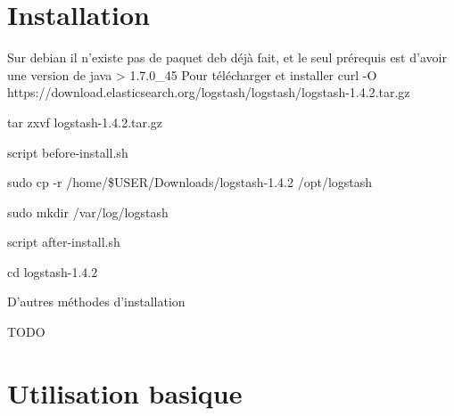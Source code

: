 \section{Installation}
Sur debian il n'existe pas de paquet deb déjà fait, et le seul prérequis 
est d'avoir une version de java > 1.7.0_45
Pour télécharger et installer
curl -O https://download.elasticsearch.org/logstash/logstash/logstash-1.4.2.tar.gz

tar zxvf logstash-1.4.2.tar.gz

script before-install.sh

sudo cp -r /home/\$USER/Downloads/logstash-1.4.2 /opt/logstash

sudo mkdir /var/log/logstash

script after-install.sh

cd logstash-1.4.2


D'autres méthodes d'installation

TODO




\section{Utilisation basique}
